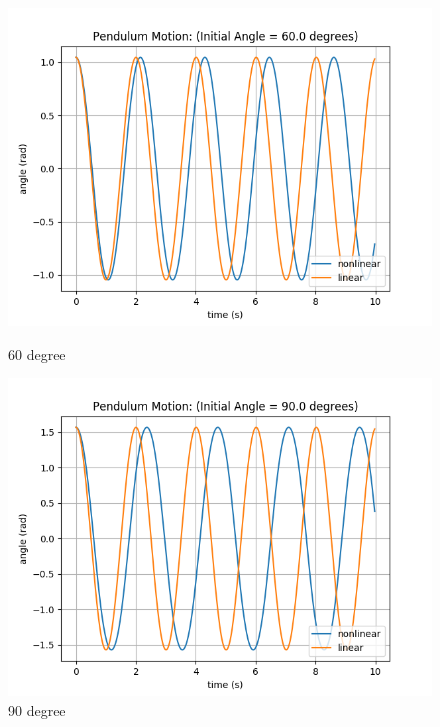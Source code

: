 \documentclass{article}
\begin{document}
\begin{figure}[h]
    \begin{minipage}{0.45\textwidth}
        \centering
        \includegraphics[width=1.2\textwidth]{Figure_60.png} %
        \caption{60 degree}
    \end{minipage}\hfill
    \begin{minipage}{0.45\textwidth}
        \centering
        \includegraphics[width=1.2\textwidth]{Figure_90.png} %
        \caption{90 degree}
    \end{minipage}
\end{figure}
\end{document}
